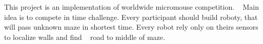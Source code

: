 This project is an implementation of worldwide micromouse competition. ~\newline
Main idea is to compete in time challenge. Every participant should build roboty, that will pass unknown maze in shortest time. Every robot rely only on theirs sensors to localize walls and find ~\newline
road to middle of maze. 